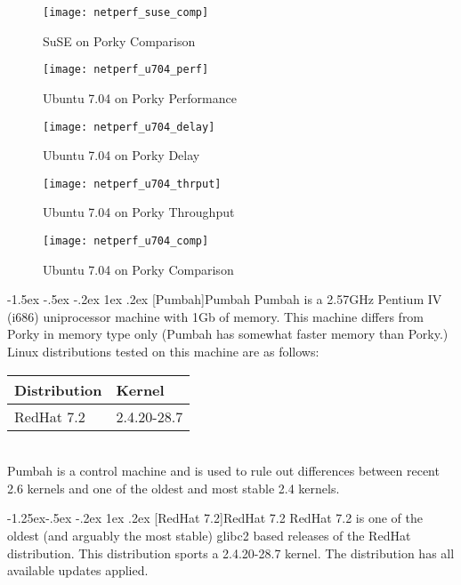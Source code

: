 \documentclass[letterpaper,final,notitlepage,twocolumn,10pt,twoside]{article}
\makeatletter
\renewcommand\subsection{\@startsection{subsection}{2}{\z@}%
                                     {-1.5ex \@plus -.5ex \@minus -.2ex}%
                                     {1ex \@plus .2ex}%
                                     {\normalfont\normalsize\bfseries}}
\renewcommand\subsubsection{\@startsection{subsubsection}{3}{\z@}%
                                     {-1.25ex\@plus -.5ex \@minus -.2ex}%
                                     {1ex \@plus .2ex}%
                                     {\normalfont\normalsize\bfseries}}
\makeatother
\begin{document}
\begin{figure}[p]
\center\texttt{[image: netperf\_suse\_comp]}
\caption[SuSE on Porky Comparison]{SuSE on Porky Comparison}
\label{figure:susecomp}
\end{figure}

\begin{figure}[p]
\center\texttt{[image: netperf\_u704\_perf]}
\caption[Ubuntu 7.04 on Porky Performance]{Ubuntu 7.04 on Porky Performance}
\label{figure:u704perf}
\end{figure}

\begin{figure}[p]
\center\texttt{[image: netperf\_u704\_delay]}
\caption[Ubuntu 7.04 on Porky Delay]{Ubuntu 7.04 on Porky Delay}
\label{figure:u704dly}
\end{figure}

\begin{figure}[p]
\center\texttt{[image: netperf\_u704\_thrput]}
\caption[Ubuntu 7.04 on Porky Throughput]{Ubuntu 7.04 on Porky Throughput}
\label{figure:u704thrput}
\end{figure}

\begin{figure}[p]
\center\texttt{[image: netperf\_u704\_comp]}
\caption[Ubuntu 7.04 on Porky Comparison]{Ubuntu 7.04 on Porky Comparison}
\label{figure:u704comp}
\end{figure}

\subsection[Pumbah]{Pumbah}
Pumbah is a 2.57GHz Pentium IV (i686) uniprocessor machine with 1Gb of memory.
This machine differs from Porky in memory type only (Pumbah has somewhat
faster memory than Porky.) Linux distributions tested on this machine are as
follows:

\begin{tabular}{ll}\\
Distribution & Kernel\\
\hline
RedHat 7.2 & 2.4.20-28.7\\
\end{tabular}\\[1.0ex]

Pumbah is a control machine and is used to rule out differences between recent
2.6 kernels and one of the oldest and most stable 2.4 kernels.

\subsubsection[RedHat 7.2]{RedHat 7.2}
RedHat 7.2 is one of the oldest (and arguably the most stable) glibc2 based
releases of the RedHat distribution.  This distribution sports a 2.4.20-28.7
kernel.  The distribution has all available updates applied.
\end{document}
